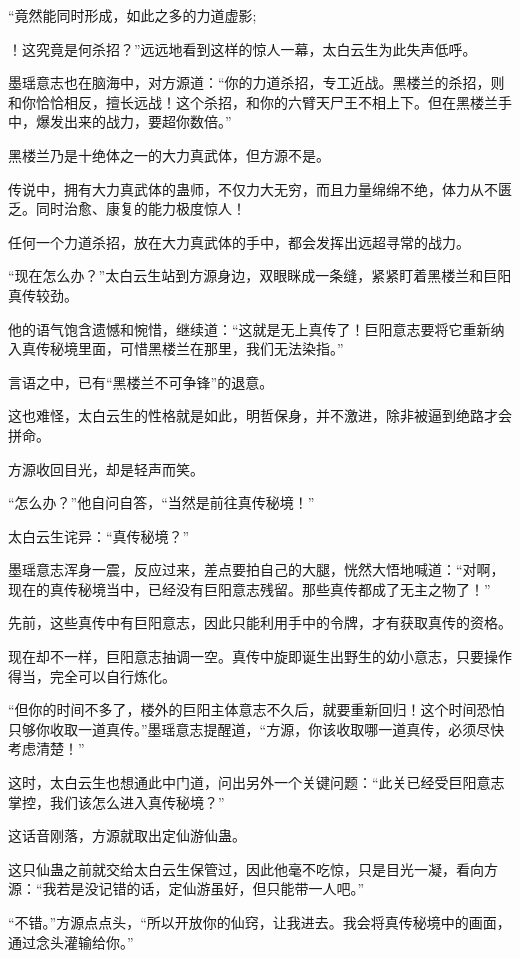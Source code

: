 \begin{this_body}
“竟然能同时形成，如此之多的力道虚影;

！这究竟是何杀招？”远远地看到这样的惊人一幕，太白云生为此失声低呼。

墨瑶意志也在脑海中，对方源道：“你的力道杀招，专工近战。黑楼兰的杀招，则和你恰恰相反，擅长远战！这个杀招，和你的六臂天尸王不相上下。但在黑楼兰手中，爆发出来的战力，要超你数倍。”

黑楼兰乃是十绝体之一的大力真武体，但方源不是。

传说中，拥有大力真武体的蛊师，不仅力大无穷，而且力量绵绵不绝，体力从不匮乏。同时治愈、康复的能力极度惊人！

任何一个力道杀招，放在大力真武体的手中，都会发挥出远超寻常的战力。

“现在怎么办？”太白云生站到方源身边，双眼眯成一条缝，紧紧盯着黑楼兰和巨阳真传较劲。

他的语气饱含遗憾和惋惜，继续道：“这就是无上真传了！巨阳意志要将它重新纳入真传秘境里面，可惜黑楼兰在那里，我们无法染指。”

言语之中，已有“黑楼兰不可争锋”的退意。

这也难怪，太白云生的性格就是如此，明哲保身，并不激进，除非被逼到绝路才会拼命。

方源收回目光，却是轻声而笑。

“怎么办？”他自问自答，“当然是前往真传秘境！”

太白云生诧异：“真传秘境？”

墨瑶意志浑身一震，反应过来，差点要拍自己的大腿，恍然大悟地喊道：“对啊，现在的真传秘境当中，已经没有巨阳意志残留。那些真传都成了无主之物了！”

先前，这些真传中有巨阳意志，因此只能利用手中的令牌，才有获取真传的资格。

现在却不一样，巨阳意志抽调一空。真传中旋即诞生出野生的幼小意志，只要操作得当，完全可以自行炼化。

“但你的时间不多了，楼外的巨阳主体意志不久后，就要重新回归！这个时间恐怕只够你收取一道真传。”墨瑶意志提醒道，“方源，你该收取哪一道真传，必须尽快考虑清楚！”

这时，太白云生也想通此中门道，问出另外一个关键问题：“此关已经受巨阳意志掌控，我们该怎么进入真传秘境？”

这话音刚落，方源就取出定仙游仙蛊。

这只仙蛊之前就交给太白云生保管过，因此他毫不吃惊，只是目光一凝，看向方源：“我若是没记错的话，定仙游虽好，但只能带一人吧。”

“不错。”方源点点头，“所以开放你的仙窍，让我进去。我会将真传秘境中的画面，通过念头灌输给你。”


\end{this_body}
